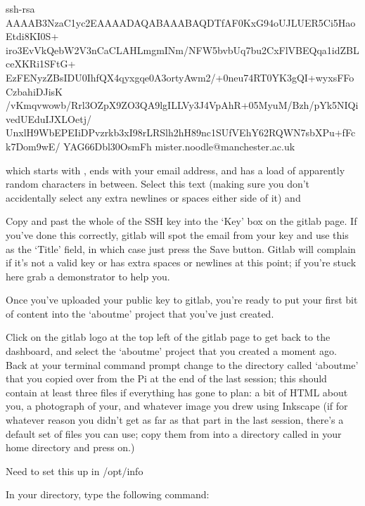 \begin{ttoutenv}
  
  ssh-rsa  AAAAB3NzaC1yc2EAAAADAQABAAABAQDTfAF0KxG94oUJLUER5Ci5HaoEtdi8KI0S+
  iro3EvVkQebW2V3nCaCLAHLmgmINm/NFW5bvbUq7bu2CxFlVBEQqa1idZBLceXKRi1SFtG+
  EzFENyzZBsIDU0IhfQX4qyxgqe0A3ortyAwm2/+0neu74RT0YK3gQI+wyxsFFoCzbahiDJisK
  /vKmqvwowb/Rrl3OZpX9ZO3QA9lgILLVy3J4VpAhR+05MyuM/Bzh/pYk5NIQivedUEduIJXLOetj/
  UnxlH9WbEPEIiDPvzrkb3xI98rLRSlh2hH89nc1SUfVEhY62RQWN7sbXPu+fFck7Dom9wE/
  YAG66Dbl30OsmFh mister.noodle@manchester.ac.uk

\end{ttoutenv}


which starts with , ends with your email address, and has a load of apparently random characters in between. Select this text (making sure you don't accidentally select any extra newlines or spaces either side of it) and 

Copy and past the whole of the SSH key into the `Key' box on the gitlab page. If you've done this correctly, gitlab will spot the email from your key and use this as the `Title' field, in which case just press the Save button. Gitlab will complain if it's not a valid key or has extra spaces or newlines at this point; if you're stuck here grab a demonstrator to help you. 

Once you've uploaded your public key to gitlab, you're ready to put your first bit of content into the `aboutme' project that you've just created. 

Click on the gitlab logo at the top left of the gitlab page to get back to the dashboard, and select the `aboutme' project that you created a moment ago.  Back at your terminal command prompt change to the directory called `aboutme' that you copied over from the Pi at the end of the last session; this should contain at least three files if everything has gone to plan: a bit of HTML about you, a photograph of your, and whatever image you drew using Inkscape (if for whatever reason you didn't get as far as that part in the last session, there's a default set of files you can use; copy them from  into a directory called  in your home directory and press on.)

\begin{note}
 Need to set this up in /opt/info
\end{note}

In your  directory, type the following command:



